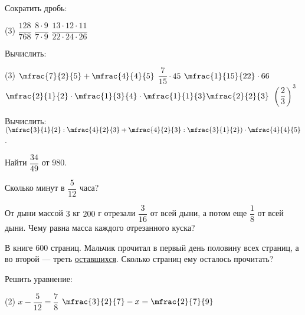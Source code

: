 \begin{class}[number=3]
	\begin{listofex}
		\item Сократить дробь:
		\begin{tasks}(3)
			\task \( \dfrac{128}{768} \)
			\task \( \dfrac{8\cdot9}{7\cdot9} \)
			\task \( \dfrac{13\cdot12\cdot11}{22\cdot24\cdot26} \)
		\end{tasks}
		\item Вычислить:
		\begin{tasks}(3)
			\task \( \mfrac{7}{2}{5}+\mfrac{4}{4}{5} \)
			\task \( \dfrac{7}{15}\cdot45 \)
			\task \( \mfrac{1}{15}{22}\cdot66 \)
			\task \( \mfrac{2}{1}{2}\cdot\mfrac{1}{3}{4}\cdot\mfrac{1}{1}{3}\mfrac{2}{2}{3} \)
			\task \( \left( \dfrac{2}{3} \right)^3 \)
		\end{tasks}
		\item Вычислить:\quad\( \left( \mfrac{3}{1}{2}:\mfrac{4}{2}{3}+\mfrac{4}{2}{3}:\mfrac{3}{1}{2} \right)\cdot\mfrac{4}{4}{5} \).
		\item Найти \( \dfrac{34}{49} \) от \( 980 \).
		\item Сколько минут в \( \dfrac{5}{12} \) часа?
		\item От дыни массой \( 3 \) кг \( 200 \) г отрезали \( \dfrac{3}{16} \) от всей дыни, а потом еще \( \dfrac{1}{8} \) от всей дыни. Чему равна масса
		каждого отрезанного куска?
		\item В книге \( 600 \) страниц. Мальчик прочитал в первый день половину всех страниц, а во второй --- треть \underline{оставшихся}. Сколько страниц ему осталось прочитать?
		\item Решить уравнение:
		\begin{tasks}(2)
			\task \( x-\dfrac{5}{12}=\dfrac{7}{8} \)
			\task \( \mfrac{3}{2}{7}-x=\mfrac{2}{7}{9} \)
		\end{tasks}
	\end{listofex}
\end{class}
%
